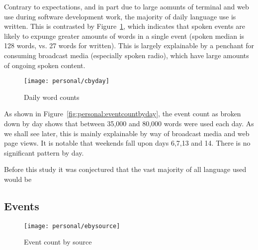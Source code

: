 Contrary to expectations, and in part due to large aomunts of terminal and web use during software development work, the majority of daily language use is written.  This is contrasted by Figure~\ref{fig:personal:wordcountbyday}, which indicates that spoken events are likely to expunge greater amounts of words in a single event (spoken median is 128 words, vs. 27 words for written).  This is largely explainable by a penchant for consuming broadcast media (especially spoken radio), which have large amounts of ongoing spoken content.

% 


\begin{figure}[hp]
\centering
\texttt{[image: personal/cbyday]}
\caption{Daily word counts}
\label{fig:personal:wordcountbyday}
\end{figure}

As shown in Figure~\ref{fig:personal:eventcountbyday}, the event count as broken down by day shows that between 35,000 and 80,000 words were used each day.  As we shall see later, this is mainly explainable by way of broadcast media and web page views.  It is notable that weekends fall upon days 6,7,13 and 14.  There is no significant pattern by day.

Before this study it was conjectured that the vast majority of all language used would be 








\subsection{Events}

\begin{figure}[hp]
    \centering
    \texttt{[image: personal/ebysource]}
    \caption{Event count by source}
    \label{fig:personal:eventsbysource}
\end{figure}

